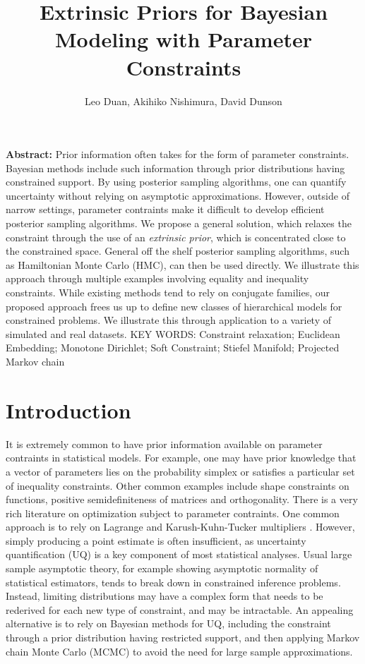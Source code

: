 \documentclass[10pt]{article}
\title{\textbf{Extrinsic Priors for Bayesian Modeling with Parameter Constraints}}
\author{Leo Duan, Akihiko Nishimura, David Dunson}
\date{}
\DeclareMathOperator{\1}{\mathbbm{1}}
\begin{document}
\maketitle
{\bf Abstract:} Prior information often takes for the form of parameter constraints. Bayesian methods include such information through prior distributions having constrained support. By using posterior sampling algorithms, one can quantify uncertainty without relying on asymptotic approximations. However, outside of narrow settings, parameter contraints make it difficult to develop efficient posterior sampling algorithms. We propose a general solution, which relaxes the constraint through the use of an {\em extrinsic prior}, which is concentrated close to the constrained space. General off the shelf posterior sampling algorithms, such as Hamiltonian Monte Carlo (HMC), can then be used directly. We illustrate this approach through multiple examples involving equality and inequality constraints. While existing methods tend to rely on conjugate families, our proposed approach frees us up to define new classes of hierarchical models for constrained problems. We illustrate this through application to a variety of simulated and real datasets.
\vskip 12pt
{\noindent KEY WORDS: Constraint relaxation; Euclidean Embedding; Monotone Dirichlet; Soft Constraint; Stiefel Manifold; Projected Markov chain}
{}


\section{Introduction}
It is extremely common to have prior information available on parameter
contraints in statistical models. For example, one may have prior knowledge
that a vector of parameters lies on the probability simplex or satisfies a
particular set of inequality constraints. Other common examples include
shape constraints on functions, positive semidefiniteness of matrices and
orthogonality. There is a very rich literature on optimization subject to
parameter contraints. One common approach is to rely on Lagrange and
Karush-Kuhn-Tucker multipliers \citep{boyd2004convex}. However, simply
producing a point estimate is often insufficient, as uncertainty
quantification (UQ) is a key component of most statistical analyses. Usual
large sample asymptotic theory, for example showing asymptotic normality of
statistical estimators, tends to break down in constrained inference
problems. Instead, limiting distributions may have a complex form that
needs to be rederived for each new type of constraint, and may be
intractable. An appealing alternative is to rely on Bayesian methods for
UQ, including the constraint through a prior distribution having restricted
support, and then applying Markov chain Monte Carlo (MCMC) to avoid the
need for large sample approximations.
\end{document}
